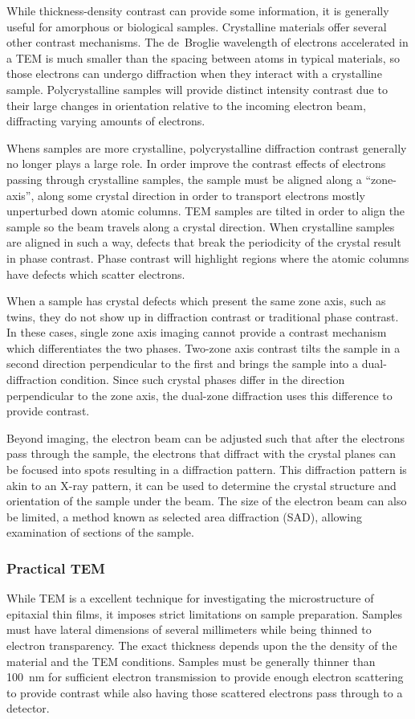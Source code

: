 While thickness-density contrast can provide some information, it is generally useful for amorphous or biological samples.
Crystalline materials offer several other contrast mechanisms.
The de~Broglie wavelength of electrons accelerated in a TEM is much smaller than the spacing between atoms in typical materials, so those electrons can undergo diffraction when they interact with a crystalline sample.
Polycrystalline samples will provide distinct intensity contrast due to their large changes in orientation relative to the incoming electron beam, diffracting varying amounts of electrons\cite{Egerton2005}.

Whens samples are more crystalline, polycrystalline diffraction contrast generally no longer plays a large role.
In order improve the contrast effects of electrons passing through crystalline samples, the sample must be aligned along a ``zone-axis'', along some crystal direction in order to transport electrons mostly unperturbed down atomic columns.
TEM samples are tilted in order to align the sample so the beam travels along a crystal direction.
When crystalline samples are aligned in such a way, defects that break the periodicity of the crystal result in phase contrast.
Phase contrast will highlight regions where the atomic columns have defects which scatter electrons\cite{Egerton2005}.

When a sample has crystal defects which present the same zone axis, such as twins, they do not show up in diffraction contrast or traditional phase contrast.
In these cases, single zone axis imaging cannot provide a contrast mechanism which differentiates the two phases.
Two-zone axis contrast tilts the sample in a second direction perpendicular to the first and brings the sample into a dual-diffraction condition.
Since such crystal phases differ in the direction perpendicular to the zone axis, the dual-zone diffraction uses this difference to provide contrast.

Beyond imaging, the electron beam can be adjusted such that after the electrons pass through the sample, the electrons that diffract with the crystal planes can be focused into spots resulting in a diffraction pattern.
This diffraction pattern is akin to an X-ray pattern, it can be used to determine the crystal structure and orientation of the sample under the beam.
The size of the electron beam can also be limited, a method known as selected area diffraction (SAD), allowing examination of sections of the sample.
\subsubsection{Practical TEM} While TEM is a excellent technique for investigating the microstructure of epitaxial thin films, it imposes strict limitations on sample preparation.
Samples must have lateral dimensions of several millimeters while being thinned to electron transparency.
The exact thickness depends upon the the density of the material and the TEM conditions.
Samples must be generally thinner than 100~nm for sufficient electron transmission to provide enough electron scattering to provide contrast while also having those scattered electrons pass through to a detector.

